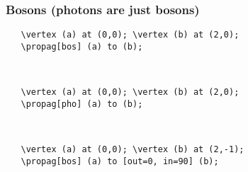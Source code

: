 \documentclass[10pt,letterpaper,twoside,notitlepage]{article}
\numberwithin{figure}{section}
\begin{document}
\subsubsection*{Bosons (photons are just bosons)}
%
\begin{minipage}{0.7\linewidth}
\vercol\begin{verbatim}
   \vertex (a) at (0,0); \vertex (b) at (2,0);
   \propag[bos] (a) to (b);
\end{verbatim}\txcol
\end{minipage}
%
\begin{minipage}{0.25\linewidth}
\end{minipage}
\\
%
\begin{minipage}{0.7\linewidth}
\vercol\begin{verbatim}
   \vertex (a) at (0,0); \vertex (b) at (2,0);
   \propag[pho] (a) to (b);
\end{verbatim}\txcol
\end{minipage}
%
\begin{minipage}{0.25\linewidth}
\end{minipage}
\\
\begin{minipage}{0.7\linewidth}
\vercol\begin{verbatim}
   \vertex (a) at (0,0); \vertex (b) at (2,-1);
   \propag[bos] (a) to [out=0, in=90] (b);
\end{verbatim}\txcol
\end{minipage}
%
\begin{minipage}{0.25\linewidth}
\end{minipage}
\\
%
\end{document}
